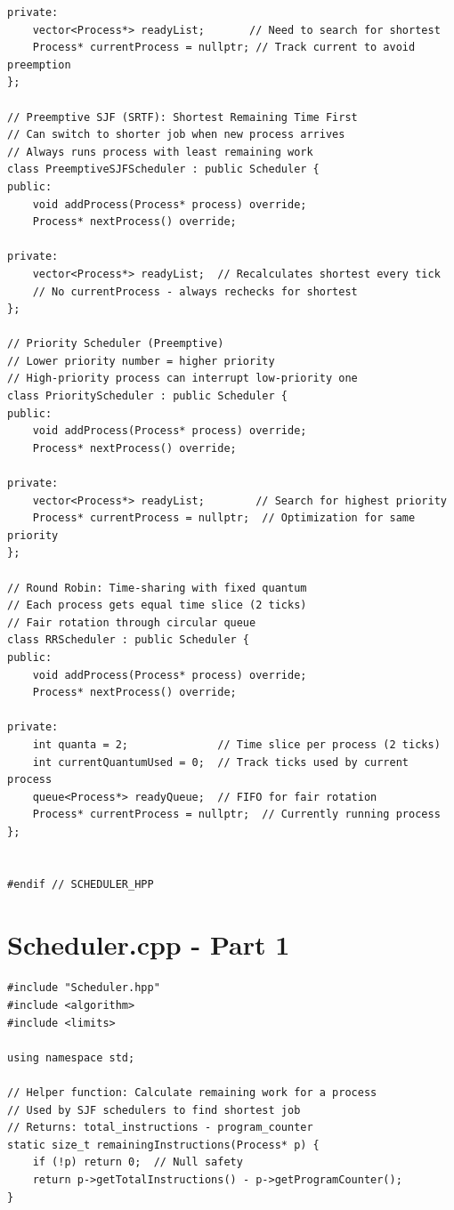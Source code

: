 \documentclass[a4paper,10pt,oneside]{article}
\begin{document}
\begin{multicols*}{\COLS}
\begin{lstlisting}
private:
    vector<Process*> readyList;       // Need to search for shortest
    Process* currentProcess = nullptr; // Track current to avoid preemption
};

// Preemptive SJF (SRTF): Shortest Remaining Time First
// Can switch to shorter job when new process arrives
// Always runs process with least remaining work
class PreemptiveSJFScheduler : public Scheduler {
public:
    void addProcess(Process* process) override;
    Process* nextProcess() override;

private:
    vector<Process*> readyList;  // Recalculates shortest every tick
    // No currentProcess - always rechecks for shortest
};

// Priority Scheduler (Preemptive)
// Lower priority number = higher priority
// High-priority process can interrupt low-priority one
class PriorityScheduler : public Scheduler {
public:
    void addProcess(Process* process) override;
    Process* nextProcess() override;

private:
    vector<Process*> readyList;        // Search for highest priority
    Process* currentProcess = nullptr;  // Optimization for same priority
};

// Round Robin: Time-sharing with fixed quantum
// Each process gets equal time slice (2 ticks)
// Fair rotation through circular queue
class RRScheduler : public Scheduler {
public:
    void addProcess(Process* process) override;
    Process* nextProcess() override;

private:
    int quanta = 2;              // Time slice per process (2 ticks)
    int currentQuantumUsed = 0;  // Track ticks used by current process
    queue<Process*> readyQueue;  // FIFO for fair rotation
    Process* currentProcess = nullptr;  // Currently running process
};


#endif // SCHEDULER_HPP
\end{lstlisting}

\section*{Scheduler.cpp - Part 1}
\begin{lstlisting}
#include "Scheduler.hpp"
#include <algorithm>
#include <limits>

using namespace std;

// Helper function: Calculate remaining work for a process
// Used by SJF schedulers to find shortest job
// Returns: total_instructions - program_counter
static size_t remainingInstructions(Process* p) {
    if (!p) return 0;  // Null safety
    return p->getTotalInstructions() - p->getProgramCounter();
}


\end{lstlisting}
\end{multicols*}
\end{document}
